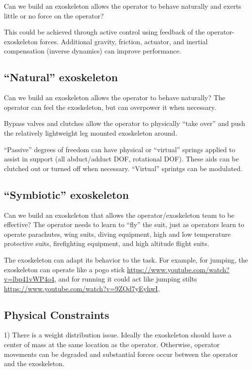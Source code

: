 \documentclass[letterpaper,12pt,fullpage]{article}
\begin{document}
Can we build an exoskeleton allows the operator to behave naturally
and exerts little or no force on the operator?

This could be achieved through active control using feedback of the
operator-exoskeleton forces. Additional gravity, friction, actuator, and
inertial compensation (inverse dynamics) can improve performance.

\subsection{``Natural'' exoskeleton}

Can we build an exoskeleton allows the operator to behave naturally?
The operator can feel the exoskeleton, but can overpower it when necessary.

Bypass valves and clutches allow the operator to physically ``take over''
and push the relatively lightweight leg mounted exoskeleton around.

``Passive'' degrees of freedom can have physical or ``virtual'' springs
applied to assist in support (all abduct/adduct DOF, rotational DOF).
These aids can be clutched out or turned off when necessary.
``Virtual'' sprintgs can be modulated.

\subsection{``Symbiotic'' exoskeleton}

Can we build an exoskeleton that allows the operator/exoskeleton team
to be effective? The operator needs to learn to ``fly'' the suit,
just as operators learn to operate parachutes,
wing suits, diving equipment, high and low temperature protective
suits, firefighting equipment, and high altitude flight suits.

The exoskeleton can adapt its behavior to the task.
For example, for jumping, the exoskeleton can operate like a pogo 
stick \url{https://www.youtube.com/watch?v=lbp41vWP4o4}, 
and for running it could act like jumping 
stilts \url{https://www.youtube.com/watch?v=9ZOd7yEyhwI},

\subsection{Physical Constraints}

1) There is a weight distribution issue. Ideally the exoskeleton should
have a center of mass at the same location as the operator. Otherwise,
operator movements can be degraded and substantial forces occur between
the operator and the exoskeleton.
\end{document}
